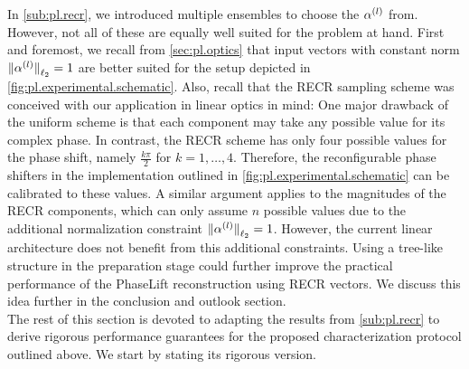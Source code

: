 In \cref{sub:pl.recr}, we introduced multiple ensembles to choose the $\alpha^{(l)}$ from.
However, not all of these are equally well suited for the problem at hand.
First and foremost, we recall from \cref{sec:pl.optics} that input vectors with constant norm ${\Vert\alpha^{(l)}\Vert}_{\ell_2} = 1$ are better suited for the setup depicted in \cref{fig:pl.experimental.schematic}.
Also, recall that the RECR sampling scheme was conceived with our application in linear optics in mind:
One major drawback of the uniform scheme is that each component may take any possible value for its complex phase.
In contrast, the RECR scheme has only four possible values for the phase shift, namely $\frac{k \pi}{2}$ for $k=1,\ldots,4$.
Therefore, the reconfigurable phase shifters in the implementation outlined in \cref{fig:pl.experimental.schematic} can be calibrated to these values.
A similar argument applies to the magnitudes of the RECR components, which can only assume $n$ possible values due to the additional normalization constraint ${\Vert\alpha^{(l)}\Vert}_{\ell_2} = 1$.
However, the current linear architecture does not benefit from this additional constraints.
Using a tree-like structure in the preparation stage could further improve the practical performance of the PhaseLift reconstruction using RECR vectors.
We discuss this idea further in the conclusion and outlook section.\\



The rest of this section is devoted to adapting the results from \cref{sub:pl.recr} to derive rigorous performance guarantees for the proposed characterization protocol outlined above.
We start by stating its rigorous version.


